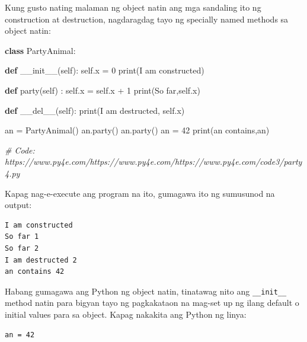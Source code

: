\documentclass[10pt,]{book}
\newenvironment{Shaded}{}{}
\newcommand{\BuiltInTok}[1]{\textcolor[rgb]{0.00,0.50,0.00}{#1}}
\newcommand{\CommentTok}[1]{\textcolor[rgb]{0.38,0.63,0.69}{\textit{#1}}}
\newcommand{\DecValTok}[1]{\textcolor[rgb]{0.25,0.63,0.44}{#1}}
\newcommand{\FunctionTok}[1]{\textcolor[rgb]{0.02,0.16,0.49}{#1}}
\newcommand{\KeywordTok}[1]{\textcolor[rgb]{0.00,0.44,0.13}{\textbf{#1}}}
\newcommand{\NormalTok}[1]{#1}
\newcommand{\OperatorTok}[1]{\textcolor[rgb]{0.40,0.40,0.40}{#1}}
\newcommand{\StringTok}[1]{\textcolor[rgb]{0.25,0.44,0.63}{#1}}
\newcommand{\VariableTok}[1]{\textcolor[rgb]{0.10,0.09,0.49}{#1}}
\begin{document}
Kung gusto nating malaman ng object natin ang mga sandaling ito ng
construction at destruction, nagdaragdag tayo ng specially named methods
sa object natin:

\begin{Shaded}
\begin{Highlighting}[]
\KeywordTok{class}\NormalTok{ PartyAnimal:}

   \KeywordTok{def} \FunctionTok{\_\_init\_\_}\NormalTok{(}\VariableTok{self}\NormalTok{):}
     \VariableTok{self}\NormalTok{.x }\OperatorTok{=} \DecValTok{0}
     \BuiltInTok{print}\NormalTok{(}\StringTok{\textquotesingle{}I am constructed\textquotesingle{}}\NormalTok{)}

   \KeywordTok{def}\NormalTok{ party(}\VariableTok{self}\NormalTok{) :}
     \VariableTok{self}\NormalTok{.x }\OperatorTok{=} \VariableTok{self}\NormalTok{.x }\OperatorTok{+} \DecValTok{1}
     \BuiltInTok{print}\NormalTok{(}\StringTok{\textquotesingle{}So far\textquotesingle{}}\NormalTok{,}\VariableTok{self}\NormalTok{.x)}

   \KeywordTok{def} \FunctionTok{\_\_del\_\_}\NormalTok{(}\VariableTok{self}\NormalTok{):}
     \BuiltInTok{print}\NormalTok{(}\StringTok{\textquotesingle{}I am destructed\textquotesingle{}}\NormalTok{, }\VariableTok{self}\NormalTok{.x)}

\NormalTok{an }\OperatorTok{=}\NormalTok{ PartyAnimal()}
\NormalTok{an.party()}
\NormalTok{an.party()}
\NormalTok{an }\OperatorTok{=} \DecValTok{42}
\BuiltInTok{print}\NormalTok{(}\StringTok{\textquotesingle{}an contains\textquotesingle{}}\NormalTok{,an)}

\CommentTok{\# Code: https://www.py4e.com/https://www.py4e.com/https://www.py4e.com/code3/party4.py}
\end{Highlighting}
\end{Shaded}

Kapag nag-e-execute ang program na ito, gumagawa ito ng sumusunod na
output:

{\small
\begin{verbatim}
I am constructed
So far 1
So far 2
I am destructed 2
an contains 42
\end{verbatim}
}

Habang gumagawa ang Python ng object natin, tinatawag nito ang
\texttt{\_\_init\_\_} method natin para bigyan tayo ng pagkakataon na
mag-set up ng ilang default o initial values para sa object. Kapag
nakakita ang Python ng linya:

{\small
\begin{verbatim}
an = 42
\end{verbatim}
}
\end{document}
